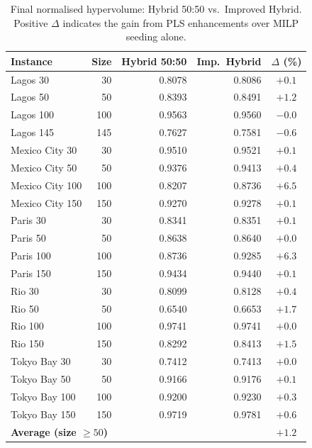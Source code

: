 \documentclass[11pt,a4paper]{article}
\begin{document}
\begin{table}[t]
\centering
\caption{Final normalised hypervolume: Hybrid 50:50 vs.\ Improved Hybrid.
  Positive $\Delta$ indicates the gain from PLS enhancements over
  MILP seeding alone.}\label{tab:results}
\begin{tabular}{lrrrc}
\toprule
\textbf{Instance} & \textbf{Size} & \textbf{Hybrid 50:50} &
  \textbf{Imp.\ Hybrid} & \textbf{$\Delta$ (\%)} \\
\midrule
Lagos 30        &  30 & 0.8078 & 0.8086 & $+0.1$ \\
Lagos 50        &  50 & 0.8393 & 0.8491 & $\mathbf{+1.2}$ \\
Lagos 100       & 100 & 0.9563 & 0.9560 & $-0.0$ \\
Lagos 145       & 145 & 0.7627 & 0.7581 & $-0.6$ \\
\midrule
Mexico City 30  &  30 & 0.9510 & 0.9521 & $+0.1$ \\
Mexico City 50  &  50 & 0.9376 & 0.9413 & $+0.4$ \\
Mexico City 100 & 100 & 0.8207 & 0.8736 & $\mathbf{+6.5}$ \\
Mexico City 150 & 150 & 0.9270 & 0.9278 & $+0.1$ \\
\midrule
Paris 30        &  30 & 0.8341 & 0.8351 & $+0.1$ \\
Paris 50        &  50 & 0.8638 & 0.8640 & $+0.0$ \\
Paris 100       & 100 & 0.8736 & 0.9285 & $\mathbf{+6.3}$ \\
Paris 150       & 150 & 0.9434 & 0.9440 & $+0.1$ \\
\midrule
Rio 30          &  30 & 0.8099 & 0.8128 & $+0.4$ \\
Rio 50          &  50 & 0.6540 & 0.6653 & $\mathbf{+1.7}$ \\
Rio 100         & 100 & 0.9741 & 0.9741 & $+0.0$ \\
Rio 150         & 150 & 0.8292 & 0.8413 & $\mathbf{+1.5}$ \\
\midrule
Tokyo Bay 30    &  30 & 0.7412 & 0.7413 & $+0.0$ \\
Tokyo Bay 50    &  50 & 0.9166 & 0.9176 & $+0.1$ \\
Tokyo Bay 100   & 100 & 0.9200 & 0.9230 & $+0.3$ \\
Tokyo Bay 150   & 150 & 0.9719 & 0.9781 & $+0.6$ \\
\midrule
\multicolumn{2}{l}{\textbf{Average (size $\ge 50$)}} &
  & & $\mathbf{+1.2}$ \\
\bottomrule
\end{tabular}
\end{table}
\end{document}
